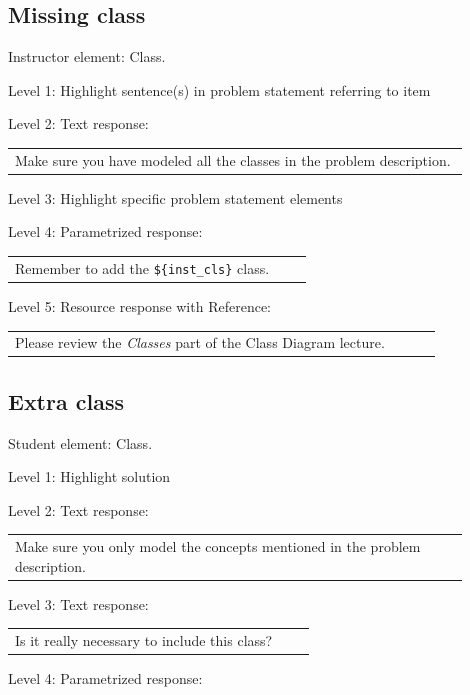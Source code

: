 \subsection{Missing class}

Instructor element: Class. \medskip

\noindent Level 1: Highlight sentence(s) in problem statement referring to item \medskip

\noindent Level 2: Text response: \medskip

\begin{tabular}{|p{0.9\linewidth}}
Make sure you have modeled all the classes in the problem description.
\end{tabular} \medskip

\noindent Level 3: Highlight specific problem statement elements \medskip

\noindent Level 4: Parametrized response: \medskip

\begin{tabular}{|p{0.9\linewidth}}
Remember to add the \verb|${inst_cls}| class.
\end{tabular} \medskip

\noindent Level 5: Resource response with Reference: \medskip

\begin{tabular}{|p{0.9\linewidth}}
Please review the \textit{Classes} part of the Class Diagram lecture.
\end{tabular} \medskip


\subsection{Extra class}

Student element: Class.  \medskip

\noindent Level 1: Highlight solution  \medskip

\noindent Level 2: Text response: \medskip

\begin{tabular}{|p{0.9\linewidth}}
Make sure you only model the concepts mentioned in the problem description.
\end{tabular} \medskip

\noindent Level 3: Text response: \medskip

\begin{tabular}{|p{0.9\linewidth}}
Is it really necessary to include this class?
\end{tabular} \medskip

\noindent Level 4: Parametrized response: \medskip

